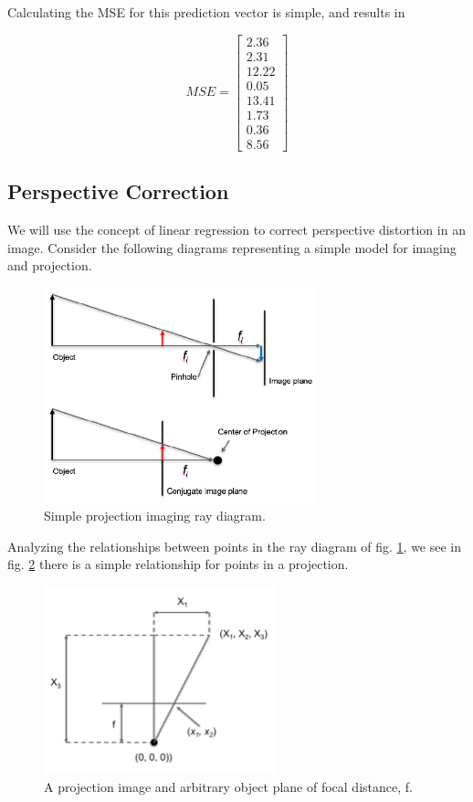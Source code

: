 \documentclass[11pt,a4paper]{article}
\begin{document}
Calculating the MSE for this prediction vector is simple, and results in

\begin{equation}
	MSE = 
	\begin{bmatrix}
	2.36 \\
	2.31 \\
	12.22 \\
	0.05 \\
	13.41 \\
	1.73 \\
	0.36 \\
	8.56
	\end{bmatrix}
\end{equation}

\pagebreak

\subsection{Perspective Correction}
We will use the concept of linear regression to correct perspective distortion in an image. Consider the following diagrams representing a simple model for imaging and projection.

\begin{figure}[ht]
	\centering
	\includegraphics[width=0.7\textwidth]{projection}
	\caption{Simple projection imaging ray diagram.}
	\label{fig:projection}
\end{figure}

Analyzing the relationships between points in the ray diagram of fig. \ref{fig:projection}, we see in fig. \ref{fig:proj_relations} there is a simple relationship for points in a projection.

\begin{figure}[ht]
	\centering
	\includegraphics[width=0.6\textwidth]{proj_relations}
	\caption{A projection image and arbitrary object plane of focal distance, f.}
	\label{fig:proj_relations}
\end{figure}
\end{document}
